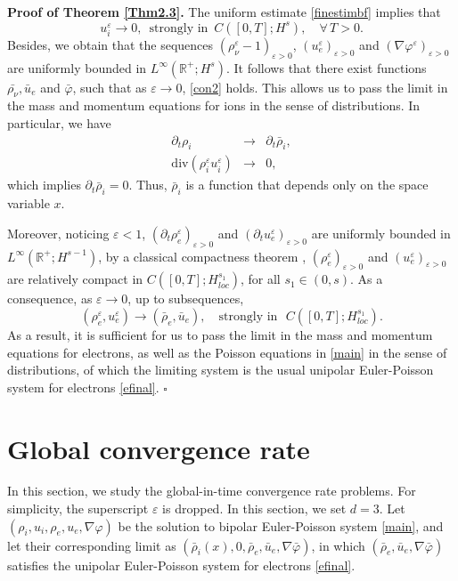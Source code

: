 \documentclass[reqno,twoside,12pt,a4paper]{amsart}
\newcommand{\R}{\mathbb{R}}
\newcommand{\eps}{\mathbb{\varepsilon}}
\newcommand{\dive}{\mathrm{div}}
\newcommand{\pt}{\partial_t}
\newcommand{\D}{\nabla}
\newcommand{\vp}{\varphi}
\numberwithin{equation}{section}
\begin{document}
\noindent \textbf{Proof of Theorem \ref{Thm2.3}.} The uniform estimate \eqref{finestimbf} implies that
\[
u_i^\eps \longrightarrow 0, \,\,\,\text{strongly in}\,\,\,C([0,T];H^s), \quad \forall \,T>0.
\]
Besides, we obtain that the sequences $(\rho_\nu^\eps-1)_{\eps>0}$,  $(u_e^\eps)_{\eps>0}$ and $(\D\vp^\eps)_{\eps>0}$ are uniformly bounded in $L^\infty(\R^+;H^s)$. It follows that there exist functions $\bar{\rho_\nu},\bar{u}_e$ and $\bar{\varphi}$, such that as $\eps\rightarrow 0$, \eqref{con2} holds. This allows us to pass the limit in the mass and momentum equations for ions in the sense of distributions. In particular, we have
\begin{eqnarray*}
\pt \rho_i &\to& \pt \bar{\rho}_i, \\
\dive(\rho_i^\eps u_i^\eps)&\to& 0,
\end{eqnarray*}
which implies $\pt \bar{\rho}_i=0.$ Thus, $\bar{\rho}_i$ is a function that depends only on the space variable $x$.

Moreover, noticing $\eps<1$, $(\pt\rho_e^\eps)_{\eps>0}$ and $(\pt u_e^\eps)_{\eps>0}$ are uniformly bounded in  $L^\infty(\R^+; H^{s-1})$,  by a classical compactness theorem \cite{Simon1987}, $(\rho_e^\eps)_{\eps>0}$ and $(u_e^\eps)_{\eps>0}$ are relatively compact in $C([0,T];H_{loc}^{s_1})$, for all $s_1\in(0,s)$. As a consequence, as $\eps\rightarrow 0$, up to subsequences,
\begin{equation}\label{conver1}
(\rho_e^\eps, u_e^\eps)\rightarrow (\bar{\rho}_e,\bar{u}_e), \quad \text{strongly in }\,\, C([0,T];H_{loc}^{s_1}).
\end{equation}
As a result, it is sufficient for us to pass the limit in the mass and momentum equations for electrons, as well as the Poisson equations in \eqref{main} in the sense of distributions, of which the limiting system is the usual unipolar Euler-Poisson system for electrons \eqref{efinal}. \hfill $\square$


\section{Global convergence rate}
In this section, we study the global-in-time convergence rate problems. For simplicity, the superscript $\eps$ is dropped. In this section, we set $d=3$. Let $(\rho_i, u_i, \rho_e, u_e, \D\vp)$ be the solution to bipolar Euler-Poisson system \eqref{main}, and let their corresponding limit as $(\bar{\rho}_i(x),0,\bar{\rho}_e, \bar{u}_e, \D\bar{\vp})$, in which $(\bar{\rho}_e, \bar{u}_e, \D\bar{\vp})$ satisfies the unipolar Euler-Poisson system for electrons \eqref{efinal}. 
\end{document}
